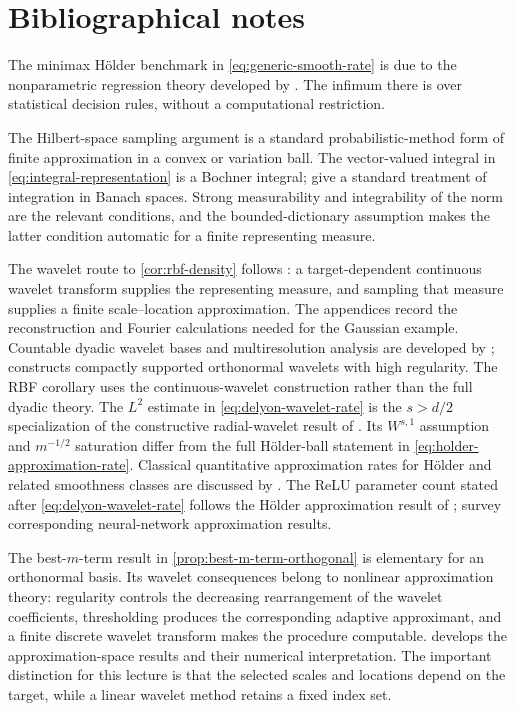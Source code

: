 \documentclass[11pt,twoside]{article}
\theoremstyle{definition}
\theoremstyle{remark}
\begin{document}
\section*{Bibliographical notes}

The minimax H\"older benchmark in \cref{eq:generic-smooth-rate} is due to the
nonparametric regression theory developed by \citet{stone1982}. The infimum
there is over statistical decision rules, without a computational
restriction.

The Hilbert-space sampling argument is a standard probabilistic-method form
of finite approximation in a convex or variation ball. The vector-valued
integral in \cref{eq:integral-representation} is a Bochner integral;
\citet{diesteluhl1977} give a standard treatment of integration in Banach
spaces. Strong measurability and integrability of the norm are the relevant
conditions, and the bounded-dictionary assumption makes the latter condition
automatic for a finite representing measure.

The wavelet route to
\cref{cor:rbf-density} follows \citet{delyon1995}: a target-dependent
continuous wavelet transform supplies the representing measure, and sampling
that measure supplies a finite scale--location approximation. The appendices
record the reconstruction and Fourier calculations needed for the Gaussian
example. Countable dyadic wavelet bases and multiresolution analysis are
developed by \citet{mallat1989}; \citet{daubechies1988} constructs compactly
supported orthonormal wavelets with high regularity. The RBF corollary uses
the continuous-wavelet construction rather than the full dyadic theory.
The \(L^2\) estimate in \cref{eq:delyon-wavelet-rate} is the
\(s>d/2\) specialization of the constructive radial-wavelet result of
\citet{delyon1995}. Its \(W^{s,1}\) assumption and \(m^{-1/2}\) saturation
differ from the full H\"older-ball statement in
\cref{eq:holder-approximation-rate}.
Classical quantitative approximation rates for H\"older and related smoothness
classes are discussed by \citet{devore1998}. The ReLU parameter count stated
after \cref{eq:delyon-wavelet-rate} follows the H\"older approximation result
of \citet{ohnkim2019}; \citet{petersen2026} survey corresponding
neural-network approximation results.

The best-\(m\)-term result in \cref{prop:best-m-term-orthogonal} is elementary
for an orthonormal basis. Its wavelet consequences belong to nonlinear
approximation theory: regularity controls the decreasing rearrangement of the
wavelet coefficients, thresholding produces the corresponding adaptive
approximant, and a finite discrete wavelet transform makes the procedure
computable. \citet{devore1998} develops the approximation-space results and
their numerical interpretation. The important distinction for this lecture is
that the selected scales and locations depend on the target, while a linear
wavelet method retains a fixed index set.
\end{document}
